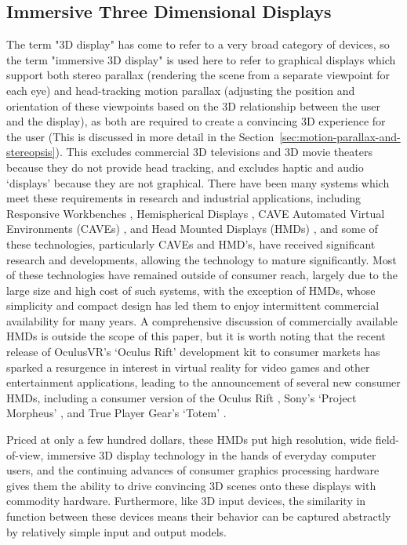 \subsection{Immersive Three Dimensional Displays}
\label{sec:3d-display}
	
	The term "3D display" has come to refer to a very broad category of devices, so the term "immersive 3D display" is used here to refer to graphical displays which support both stereo parallax (rendering the scene from a separate viewpoint for each eye) and head-tracking motion parallax (adjusting the position and orientation of these viewpoints based on the 3D relationship between the user and the display), as both are required to create a convincing 3D experience for the user (This is discussed in more detail in the Section~\ref{sec:motion-parallax-and-stereopsis}). This excludes commercial 3D televisions and 3D movie theaters because they do not provide head tracking, and excludes haptic and audio ‘displays’ because they are not graphical. There have been many systems which meet these requirements in research and industrial applications, including Responsive Workbenches \cite{responsive-workbench}, Hemispherical Displays \cite{hemi-display}, CAVE Automated Virtual Environments (CAVEs) \cite{cave}, and Head Mounted Displays (HMDs) \cite{sutherland-hmd}, and some of these technologies, particularly CAVEs and HMD’s, have received significant research and developments, allowing the technology to mature significantly. 
Most of these technologies have remained outside of consumer reach, largely due to the large size and high cost of such systems, with the exception of HMDs, whose simplicity and compact design has led them to enjoy intermittent commercial availability for many years. A comprehensive discussion of commercially available HMDs is outside the scope of this paper, but it is worth noting that the recent release of OculusVR’s ‘Oculus Rift’ development kit to consumer markets has sparked a resurgence in interest in virtual reality for video games and other entertainment applications, leading to the announcement of several new consumer HMDs, including a consumer version of the Oculus Rift \cite{oculus-rift}, Sony’s ‘Project Morpheus’ \cite{project-morpheus}, and True Player Gear’s ‘Totem’ \cite{true-player-gear}. 

Priced at only a few hundred dollars, these HMDs put high resolution, wide field-of-view, immersive 3D display technology in the hands of everyday computer users, and the continuing advances of consumer graphics processing hardware gives them the ability to drive convincing 3D scenes onto these displays with commodity hardware. Furthermore, like 3D input devices, the similarity in function between these devices means their behavior can be captured abstractly by relatively simple input and output models. 

